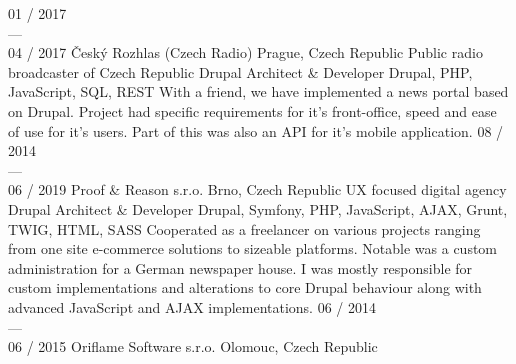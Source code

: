 \documentclass[]{friggeri-cv} %
\begin{document}
\begin{entrylist}
  \job
  {01 / 2017 \\ --- \\ 04 / 2017}
  {Český Rozhlas (Czech Radio)}
  {Prague, Czech Republic}
  {Public radio broadcaster of Czech Republic}
  {
    \position
      {Drupal Architect \& Developer}
      {Drupal, PHP, JavaScript, SQL, REST}
      {
        With a friend, we have implemented a news portal based on Drupal. Project had specific requirements for
        it's front-office, speed and ease of use for it's users. Part of this was also an API for it's mobile application.
      }%
  }
  \job
  {08 / 2014 \\ --- \\ 06 / 2019}
  {Proof \& Reason s.r.o.}
  {Brno, Czech Republic}
  {UX focused digital agency}
  {
    \position
    {Drupal Architect \& Developer}
    {Drupal, Symfony, PHP, JavaScript, AJAX, Grunt, TWIG, HTML, SASS}
    {
      Cooperated as a freelancer on various projects ranging from one site e-commerce solutions to sizeable platforms.
      Notable was a custom administration for a German newspaper house.
      I was mostly responsible for custom implementations and alterations to core Drupal behaviour along with advanced JavaScript and AJAX implementations.
    }%
  }
  \job
  {06 / 2014 \\ --- \\ 06 / 2015}
  {Oriflame Software s.r.o.}
  {Olomouc, Czech Republic}

\end{entrylist}
\end{document}
